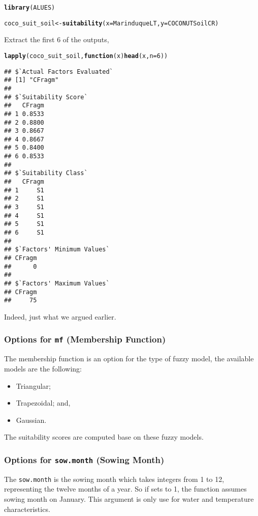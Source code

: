 \documentclass[11pt,fleqn]{article}\usepackage[]{graphicx}\usepackage[]{color}
\makeatletter
\newcommand{\hlnum}[1]{\textcolor[rgb]{0.686,0.059,0.569}{#1}}%
\newcommand{\hlstd}[1]{\textcolor[rgb]{0.345,0.345,0.345}{#1}}%
\newcommand{\hlkwa}[1]{\textcolor[rgb]{0.161,0.373,0.58}{\textbf{#1}}}%
\newcommand{\hlkwb}[1]{\textcolor[rgb]{0.69,0.353,0.396}{#1}}%
\newcommand{\hlkwc}[1]{\textcolor[rgb]{0.333,0.667,0.333}{#1}}%
\newcommand{\hlkwd}[1]{\textcolor[rgb]{0.737,0.353,0.396}{\textbf{#1}}}%
\newenvironment{kframe}{%
 \def\at@end@of@kframe{}%
 \ifinner\ifhmode%
  \def\at@end@of@kframe{\end{minipage}}%
  \begin{minipage}{\columnwidth}%
 \fi\fi%
 \def\FrameCommand##1{\hskip\@totalleftmargin \hskip-\fboxsep
 \colorbox{shadecolor}{##1}\hskip-\fboxsep
     \hskip-\linewidth \hskip-\@totalleftmargin \hskip\columnwidth}%
 \MakeFramed {\advance\hsize-\width
   \@totalleftmargin\z@ \linewidth\hsize
   \@setminipage}}%
 {\par\unskip\endMakeFramed%
 \at@end@of@kframe}
\newenvironment{knitrout}{}{} %
\makeatother
\begin{document}
\begin{knitrout}
\color{fgcolor}\begin{kframe}
\begin{alltt}
\hlkwd{library}\hlstd{(ALUES)}
\end{alltt}


{\ttfamily\noindent\itshape\color{messagecolor}{\#\# Loading required package: Rcpp}}\begin{alltt}
\hlstd{coco_suit_soil} \hlkwb{<-} \hlkwd{suitability}\hlstd{(}\hlkwc{x} \hlstd{= MarinduqueLT,} \hlkwc{y} \hlstd{= COCONUTSoilCR)}
\end{alltt}
\end{kframe}
\end{knitrout}
\noindent Extract the first 6 of the outputs,
\begin{knitrout}
\color{fgcolor}\begin{kframe}
\begin{alltt}
\hlkwd{lapply}\hlstd{(coco_suit_soil,} \hlkwa{function}\hlstd{(}\hlkwc{x}\hlstd{)} \hlkwd{head}\hlstd{(x,} \hlkwc{n} \hlstd{=} \hlnum{6}\hlstd{))}
\end{alltt}
\begin{verbatim}
## $`Actual Factors Evaluated`
## [1] "CFragm"
## 
## $`Suitability Score`
##   CFragm
## 1 0.8533
## 2 0.8800
## 3 0.8667
## 4 0.8667
## 5 0.8400
## 6 0.8533
## 
## $`Suitability Class`
##   CFragm
## 1     S1
## 2     S1
## 3     S1
## 4     S1
## 5     S1
## 6     S1
## 
## $`Factors' Minimum Values`
## CFragm 
##      0 
## 
## $`Factors' Maximum Values`
## CFragm 
##     75
\end{verbatim}
\end{kframe}
\end{knitrout}
\noindent Indeed, just what we argued earlier.
\subsubsection*{Options for \texttt{mf} (Membership Function)}
The membership function is an option for the type of fuzzy model, the available models are the following:
\begin{itemize}
\item Triangular;
\item Trapezoidal; and,
\item Gaussian.
\end{itemize}
The suitability scores are computed base on these fuzzy models.
\subsubsection*{Options for \texttt{sow.month} (Sowing Month)}
\label{sec:sow.month}
The \verb|sow.month| is the sowing month which takes integers from 1 to 12, representing the twelve months of a year. So if sets to 1, the function assumes sowing month on January. This argument is only use for water and temperature characteristics.
\end{document}
